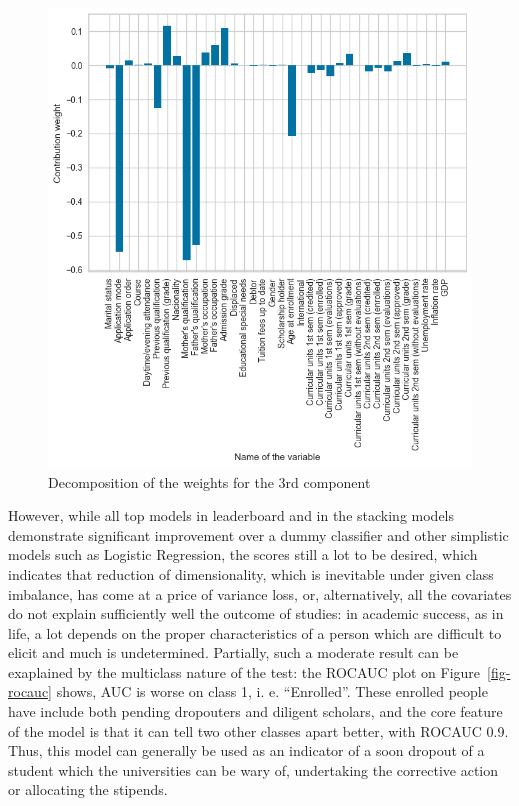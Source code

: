\documentclass[
  letterpaper,
  DIV=11,
  numbers=noendperiod]{scrartcl}
\begin{document}
\begin{figure}

{\centering \includegraphics{report_AzadhdhinNedalYunisAlFraijat_files/figure-pdf/fig-decomposition-output-1.png}

}

\caption{\label{fig-decomposition}Decomposition of the weights for the
3rd component}

\end{figure}

However, while all top models in leaderboard and in the stacking models
demonstrate significant improvement over a dummy classifier and other
simplistic models such as Logistic Regression, the scores still a lot to
be desired, which indicates that reduction of dimensionality, which is
inevitable under given class imbalance, has come at a price of variance
loss, or, alternatively, all the covariates do not explain sufficiently
well the outcome of studies: in academic success, as in life, a lot
depends on the proper characteristics of a person which are difficult to
elicit and much is undetermined. Partially, such a moderate result can
be exaplained by the multiclass nature of the test: the ROCAUC plot on
Figure~\ref{fig-rocauc} shows, AUC is worse on class 1, i. e.
\enquote{Enrolled}. These enrolled people have include both pending
dropouters and diligent scholars, and the core feature of the model is
that it can tell two other classes apart better, with ROCAUC 0.9. Thus,
this model can generally be used as an indicator of a soon dropout of a
student which the universities can be wary of, undertaking the
corrective action or allocating the stipends.
\end{document}
